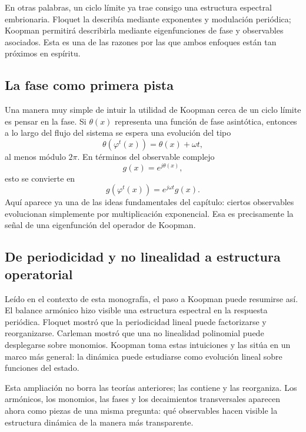 En otras palabras, un ciclo límite ya trae consigo una estructura espectral embrionaria. Floquet la describía mediante exponentes y modulación periódica; Koopman permitirá describirla mediante eigenfunciones de fase y observables asociados. Esta es una de las razones por las que ambos enfoques están tan próximos en espíritu.

\subsection{La fase como primera pista}

Una manera muy simple de intuir la utilidad de Koopman cerca de un ciclo límite es pensar en la fase. Si \(\theta(x)\) representa una función de fase asintótica, entonces a lo largo del flujo del sistema se espera una evolución del tipo
\begin{equation}
\theta(\varphi^t(x))=\theta(x)+\omega t,
\label{eq:Koopman_motivation_phase}
\end{equation}
al menos módulo \(2\pi\). En términos del observable complejo
\begin{equation}
g(x)=e^{j\theta(x)},
\label{eq:Koopman_motivation_phase_observable}
\end{equation}
esto se convierte en
\begin{equation}
g(\varphi^t(x))=e^{j\omega t}g(x).
\label{eq:Koopman_motivation_phase_eigen}
\end{equation}
Aquí aparece ya una de las ideas fundamentales del capítulo: ciertos observables evolucionan simplemente por multiplicación exponencial. Esa es precisamente la señal de una eigenfunción del operador de Koopman.

\subsection{De periodicidad y no linealidad a estructura operatorial}

Leído en el contexto de esta monografía, el paso a Koopman puede resumirse así. El balance armónico hizo visible una estructura espectral en la respuesta periódica. Floquet mostró que la periodicidad lineal puede factorizarse y reorganizarse. Carleman mostró que una no linealidad polinomial puede desplegarse sobre monomios. Koopman toma estas intuiciones y las sitúa en un marco más general: la dinámica puede estudiarse como evolución lineal sobre funciones del estado.

Esta ampliación no borra las teorías anteriores; las contiene y las reorganiza. Los armónicos, los monomios, las fases y los decaimientos transversales aparecen ahora como piezas de una misma pregunta: qué observables hacen visible la estructura dinámica de la manera más transparente.

